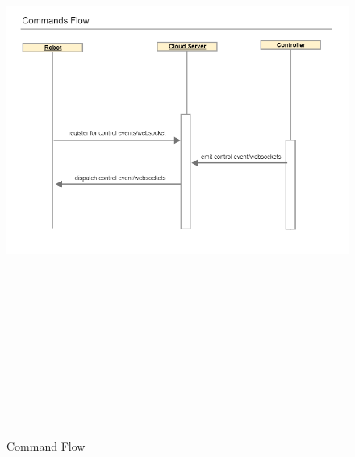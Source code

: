 \begin{figure}[ht]
    \label{fig:command-flow}
    \includegraphics[width=15cm, height=20cm,keepaspectratio]{img/command-flow.png}
    \caption{Command Flow}
\end{figure}
